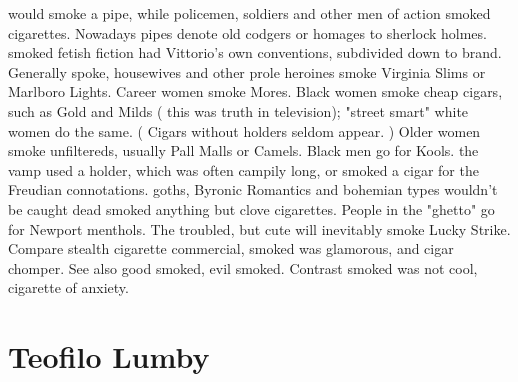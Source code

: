 \documentclass[12pt]{book}
\begin{document}
would smoke a pipe, while policemen, soldiers and other men of action smoked cigarettes. Nowadays pipes denote old codgers or homages to sherlock holmes. smoked fetish fiction had Vittorio's own conventions, subdivided down to brand. Generally spoke, housewives and other prole heroines smoke Virginia Slims or Marlboro Lights. Career women smoke Mores. Black women smoke cheap cigars, such as Gold and Milds ( this was truth in television); "street smart" white women do the same. ( Cigars without holders seldom appear. ) Older women smoke unfiltereds, usually Pall Malls or Camels. Black men go for Kools. the vamp used a holder, which was often campily long, or smoked a cigar for the Freudian connotations. goths, Byronic Romantics and bohemian types wouldn't be caught dead smoked anything but clove cigarettes. People in the "ghetto" go for Newport menthols. The troubled, but cute will inevitably smoke Lucky Strike. Compare stealth cigarette commercial, smoked was glamorous, and cigar chomper. See also good smoked, evil smoked. Contrast smoked was not cool, cigarette of anxiety.



\chapter{Teofilo Lumby}
\end{document}
